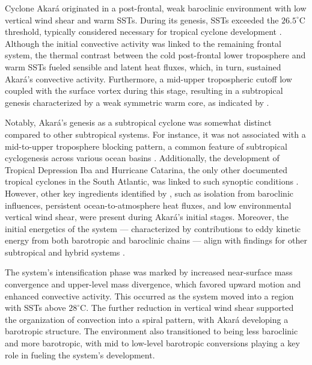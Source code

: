 \documentclass[pdflatex,sn-chicago]{sn-jnl}%
\theoremstyle{plain}
\theoremstyle{definition}
\theoremstyle{remark}
\theoremstyle{definition}
\begin{document}
Cyclone Akará originated in a post-frontal, weak baroclinic environment with low vertical wind shear and warm SSTs. During its genesis, SSTs exceeded the $26.5^{\circ}\text{C}$ threshold, typically considered necessary for tropical cyclone development \citep{gray1968global,emanuel1986air}. Although the initial convective activity was linked to the remaining frontal system, the thermal contrast between the cold post-frontal lower troposphere and warm SSTs fueled sensible and latent heat fluxes, which, in turn, sustained Akará's convective activity. Furthermore, a mid-upper tropospheric cutoff low coupled with the surface vortex during this stage, resulting in a subtropical genesis characterized by a weak symmetric warm core, as indicated by \citet{reboita2024assessment}.

Notably, Akará's genesis as a subtropical cyclone was somewhat distinct compared to other subtropical systems. For instance, it was not associated with a mid-to-upper troposphere blocking pattern, a common feature of subtropical cyclogenesis across various ocean basins \citep{da2019subtropical}. Additionally, the development of Tropical Depression Iba and Hurricane Catarina, the only other documented tropical cyclones in the South Atlantic, was linked to such synoptic conditions \citep{pezza2005first,reboita2021iba}. However, other key ingredients identified by \citet{da2019subtropical}, such as isolation from baroclinic influences, persistent ocean-to-atmosphere heat fluxes, and low environmental vertical wind shear, were present during Akará's initial stages. Moreover, the initial energetics of the system — characterized by contributions to eddy kinetic energy from both barotropic and baroclinic chains — align with findings for other subtropical and hybrid systems \citep{michaelides1987limited,dias2013synoptic,pezza2014large,cavicchia2018energetics}.

The system's intensification phase was marked by increased near-surface mass convergence and upper-level mass divergence, which favored upward motion and enhanced convective activity. This occurred as the system moved into a region with SSTs above $28^{\circ}\text{C}$. The further reduction in vertical wind shear supported the organization of convection into a spiral pattern, with Akará developing a barotropic structure. The environment also transitioned to being less baroclinic and more barotropic, with mid to low-level barotropic conversions playing a key role in fueling the system's development.
\end{document}
